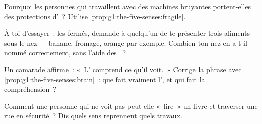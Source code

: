 \begin{exercise}[$\star$]\label{exo:g1:the-five-senses:7}
Pourquoi les personnes qui travaillent avec des machines bruyantes
portent-elles des protections d'~? Utilise
\cref{prop:g1:the-five-senses:fragile}.
\end{exercise}

\begin{exercise}[$\star$]\label{exo:g1:the-five-senses:8}
À toi d'essayer~: les  fermés, demande à quelqu'un de te
présenter trois aliments sous le nez --- banane, fromage, orange par
exemple. Combien ton nez en a-t-il nommé correctement, sans l'aide
des ~?
\end{exercise}

\begin{exercise}[$\star\star$]\label{exo:g1:the-five-senses:9}
Un camarade affirme~: «~L' comprend ce qu'il voit.~» Corrige la
phrase avec \cref{prop:g1:the-five-senses:brain}~: que fait
vraiment l', et qui fait la compréhension~?
\end{exercise}

\begin{exercise}[$\star\star$]\label{exo:g1:the-five-senses:10}
Comment une personne qui ne voit pas peut-elle «~lire~» un livre et
traverser une rue en sécurité~? Dis quels sens reprennent quels
travaux.
\end{exercise}
